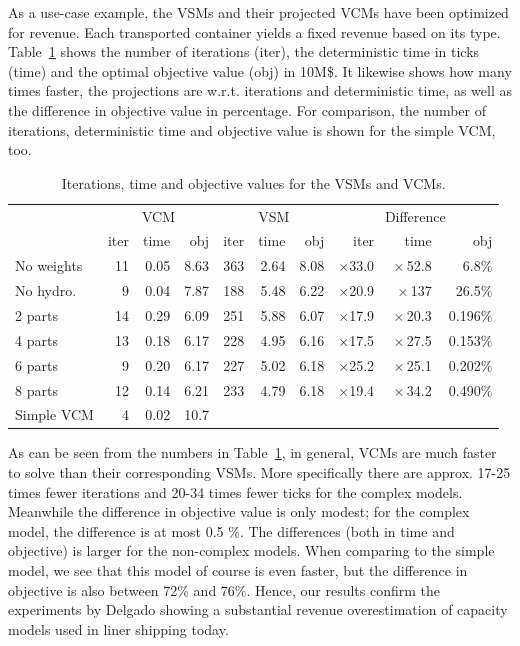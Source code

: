 \documentclass{llncs}
\newcommand{\btablesize}{\begin{scriptsize}}
\newcommand{\etablesize}{\end{scriptsize}}
\begin{document}
As a use-case example, the VSMs and their projected VCMs have been optimized for revenue. Each transported container yields a fixed revenue based on its type. 
Table~\ref{tab:usingProjections} shows the number of iterations (iter), the deterministic time in ticks (time) and the optimal objective value (obj) in 10M\$. It likewise shows how many times faster, the projections are w.r.t. iterations and deterministic time, as well as the difference in objective value in percentage. For comparison, the number of iterations, deterministic time and objective value is shown for the simple VCM, too.
\begin{table}[b!]
\caption{Iterations, time and objective values for the VSMs and VCMs.}
\label{tab:usingProjections}
\centering
\btablesize
\begin{tabular}{l|r@{\:\;}r@{\:\;}r|r@{\:\;}r@{\:\:\:}r|rrr}
&\multicolumn{3}{c|}{VCM}&\multicolumn{3}{c|}{VSM}&\multicolumn{3}{c}{Difference}\\
						&iter&time  &obj 	 &iter  &time  &obj	&iter 			 &time					&obj\\ 
\hline
No weights	&	11 & 0.05 & 8.63 &	363 & 2.64 &8.08&$\times$33.0&$\:\times$52.8&$\:$6.8$\%$\\
No hydro. 	&  9 & 0.04 & 7.87 &	188 & 5.48 &6.22&$\times$20.9&$\:\times$137 &$\:$26.5$\%$\\
2 parts			& 14 & 0.29 & 6.09 &	251 & 5.88 &6.07&$\times$17.9&$\:\times$20.3&$\:$0.196$\%$\\
4 parts		 	& 13 & 0.18 & 6.17 &  228 & 4.95 &6.16&$\times$17.5&$\:\times$27.5&$\:$0.153$\%$\\
6 parts		 	&  9 & 0.20 & 6.17 &  227 & 5.02 &6.18&$\times$25.2&$\:\times$25.1&$\:$0.202$\%$\\
8 parts		 	& 12 & 0.14 & 6.21 &  233 & 4.79 &6.18&$\times$19.4&$\:\times$34.2&$\:$0.490$\%$\\
\bottomrule
Simple VCM&  4 & 0.02 &10.7\phantom{0}\\
\end{tabular}
\etablesize
\end{table}
As can be seen from the numbers in Table~\ref{tab:usingProjections}, in general, VCMs are much faster to solve than their corresponding VSMs. More specifically there are approx. 17-25 %
 times fewer iterations and 20-34 times fewer ticks for the complex models. %
Meanwhile the difference in objective value is only modest; for the complex model, the difference is at most 0.5 \%. 
The differences (both in time and objective) is larger for the non-complex models.
When comparing to the simple model, we see that this model of course is even faster, %
but the difference in objective is also between 72\% and 76\%. %
Hence, our results confirm the experiments by Delgado \cite{AlbertosThesis} showing a substantial revenue overestimation of capacity models used in liner shipping today. \\
\end{document}
